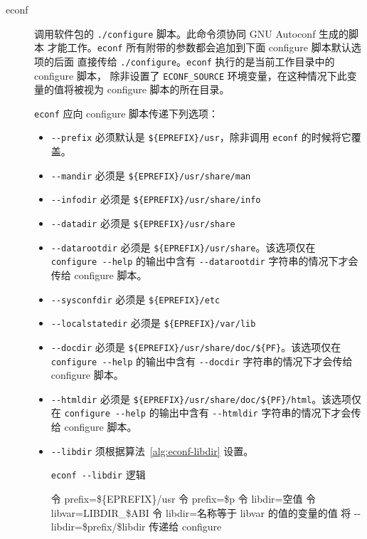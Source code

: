 \begin{description}
\item[econf] 调用软件包的 \texttt{./configure} 脚本。此命令须协同 GNU Autoconf 生成的脚本
    才能工作。\texttt{econf} 所有附带的参数都会追加到下面 configure 脚本默认选项的后面
    直接传给 \texttt{./configure}。\texttt{econf} 执行的是当前工作目录中的 configure 脚本，
    除非设置了 \texttt{ECONF_SOURCE} 环境变量，在这种情况下此变量的值将被视为 configure 脚本的所在目录。

    \texttt{econf} 应向 configure 脚本传递下列选项：
    \begin{itemize}
    \item \texttt{-{}-prefix} 必须默认是 \texttt{\$\{EPREFIX\}/usr}，除非调用 \texttt{econf} 的时候将它覆盖。
    \item \texttt{-{}-mandir} 必须是 \texttt{\$\{EPREFIX\}/usr/share/man}
    \item \texttt{-{}-infodir} 必须是 \texttt{\$\{EPREFIX\}/usr/share/info}
    \item \texttt{-{}-datadir} 必须是 \texttt{\$\{EPREFIX\}/usr/share}
    \item \texttt{-{}-datarootdir} 必须是 \texttt{\$\{EPREFIX\}/usr/share}。该选项仅在
        \texttt{configure -{}-help} 的输出中含有 \texttt{-{}-datarootdir} 字符串的情况下才会传给 configure 脚本。
    \item \texttt{-{}-sysconfdir} 必须是 \texttt{\$\{EPREFIX\}/etc}
    \item \texttt{-{}-localstatedir} 必须是 \texttt{\$\{EPREFIX\}/var/lib}
    \item \texttt{-{}-docdir} 必须是 \texttt{\$\{EPREFIX\}/usr/share/doc/\$\{PF\}}。该选项仅在
        \texttt{configure -{}-help} 的输出中含有 \texttt{-{}-docdir} 字符串的情况下才会传给 configure 脚本。
    \item \texttt{-{}-htmldir} 必须是 \texttt{\$\{EPREFIX\}/usr/share/doc/\$\{PF\}/html}。该选项仅在
        \texttt{configure -{}-help} 的输出中含有 \texttt{-{}-htmldir} 字符串的情况下才会传给 configure 脚本。
    \item \texttt{-{}-libdir} 须根据算法~\ref{alg:econf-libdir} 设置。

\begin{algorithm}
\caption{\texttt{econf -{}-libdir} 逻辑} \label{alg:econf-libdir}
\begin{algorithmic}[1]
\STATE 令 prefix=\$\{EPREFIX\}/usr
    \STATE 令 prefix=\$p
\ENDIF
\STATE 令 libdir=\hspace{0em}空值
    \STATE 令 libvar=LIBDIR_\$ABI
        \STATE 令 libdir=\hspace{0em}名称等于 libvar 的值的变量的值
    \ENDIF
\ENDIF
{}
    \STATE 将 -{}-libdir=\$prefix/\$libdir 传递给 configure
\ENDIF
\end{algorithmic}
\end{algorithm}


\end{itemize}
\end{description}
